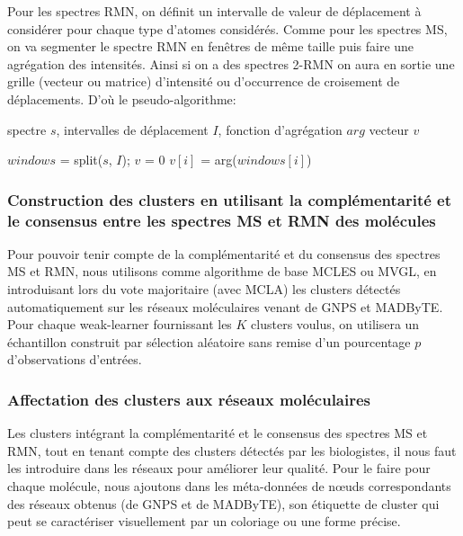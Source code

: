    	 Pour les spectres \acrshort{RMN}, on définit un intervalle de valeur de déplacement à considérer pour chaque type d'atomes considérés.
   	 Comme pour les spectres MS, on va segmenter le spectre RMN en fenêtres de même taille puis faire une agrégation des intensités.
   	 Ainsi si on a des spectres 2-RMN on aura en sortie une grille (vecteur ou matrice) d'intensité ou d'occurrence de croisement de déplacements. D’où le pseudo-algorithme:

    	\begin{algorithm}[H]
     		   \caption{Algorithme de prétraitement de spectres}
     		   \label{alg:molndbscan}
     		   \begin{algorithmic}[1]
     		   \REQUIRE spectre $s$, intervalles de déplacement $I$, fonction d'agrégation $arg$
            	\ENSURE vecteur $v$
		 
     		   \STATE $windows$ = split($s$, $I$);
            	\STATE $v$ = 0
                	$v[i]$ = arg($windows[i]$)
            	\ENDFOR
           	 
     		  \end{algorithmic}
     	  \end{algorithm}


   	 \subsubsection{Construction des clusters en utilisant la complémentarité et le consensus entre les spectres MS et RMN des molécules}

   	 Pour pouvoir tenir compte de la complémentarité et du consensus des spectres MS et RMN, nous utilisons comme algorithme de base \acrshort{MCLES} ou \acrshort{MVGL}, en introduisant lors du vote majoritaire (avec MCLA) les clusters détectés automatiquement sur les réseaux moléculaires venant de GNPS et MADByTE.
    	Pour chaque weak-learner fournissant les $K$ clusters voulus, on utilisera un échantillon construit par sélection aléatoire sans remise d'un pourcentage $p$ d'observations d'entrées.

   	 \subsubsection{Affectation des clusters aux réseaux moléculaires}

   	 Les clusters intégrant la complémentarité et le consensus des spectres MS et RMN, tout en tenant compte des clusters détectés par les biologistes, il nous faut les introduire dans les réseaux pour améliorer leur qualité.
   	 Pour le faire pour chaque molécule, nous ajoutons dans les méta-données de nœuds correspondants des réseaux obtenus (de GNPS et de MADByTE), son étiquette de cluster qui peut se caractériser visuellement par un coloriage ou une forme précise.

